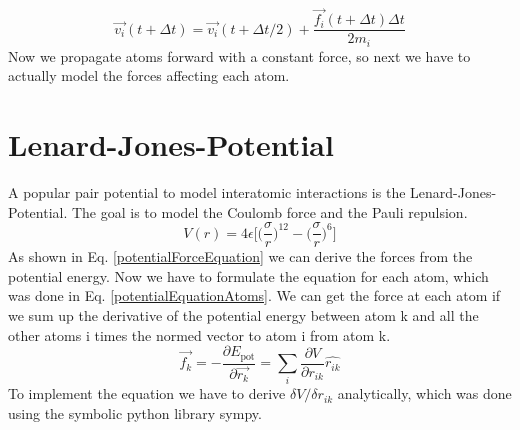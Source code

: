 \begin{equation}
	\label{verletCorrection}
	\overrightarrow{v_{i}}(t+\Delta t) = \overrightarrow{v_{i}}(t+\Delta t/2) +
	\frac{\overrightarrow{f_{i}}(t + \Delta t)\Delta t}{2m_{i}}
\end{equation}
Now we propagate atoms forward with a constant force, so next we have to actually model the forces affecting each atom.


\section{Lenard-Jones-Potential}
\begin{comment}
- pair potential
\end{comment}
A popular pair potential to model interatomic interactions is the Lenard-Jones-Potential. 
The goal is to model the Coulomb force and the Pauli repulsion. 
\begin{equation}
	V(r) = 4\epsilon\bigg[\Big(\frac{\sigma}{r}\Big)^{12}- \Big(\frac{\sigma}{r}\Big)^{6} \bigg]
\end{equation}
As shown in Eq. \ref{potentialForceEquation} we can derive the forces from the potential energy. Now we have to formulate the equation for each atom, which was done in Eq. \ref {potentialEquationAtoms}. We can get the force at each atom if we sum up the derivative of the potential energy between atom k and all the other atoms i times the normed vector to atom i from atom k. 
\begin{equation}
	\label{potentialEquationAtoms}
	\overrightarrow{f_{k}} = -\frac{\partial E_{\mathrm{pot}}}{\partial  \overrightarrow{r_{k}}} = \sum_{i}^{}\frac{\partial V}{\partial r_{ik}} \hat{r_{ik}}
\end{equation}
To implement the equation we have to derive $\delta V/ \delta r_{ik}$ analytically, which was done using the symbolic python library sympy. 
